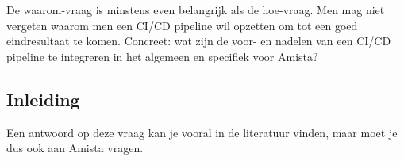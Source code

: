 
\chapter{}
\label{ch:onderzoeksdomein1}
De waarom-vraag is minstens even belangrijk als de hoe-vraag. Men mag niet vergeten waarom men een CI/CD pipeline wil opzetten om tot een goed eindresultaat te komen. Concreet: wat zijn de voor- en nadelen van een CI/CD pipeline te integreren in het algemeen en specifiek voor Amista?

\section{Inleiding}
\label{sec:inleiding}
Een antwoord op deze vraag kan je vooral in de literatuur vinden, maar moet je dus ook aan Amista vragen.